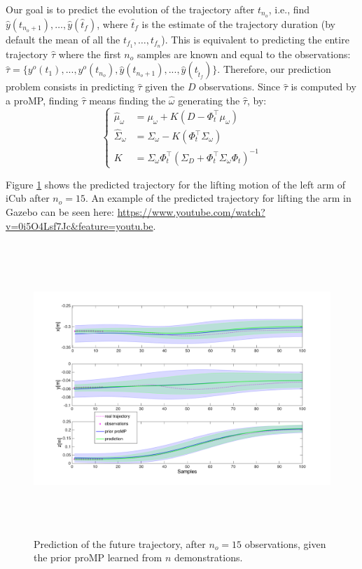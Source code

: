 Our goal is to predict the evolution of the trajectory after $t_{n_o}$, i.e., find $\hat{y}(t_{n_o+1}),\ldots,\hat{y}(\hat{t}_f)$, where $\hat{t}_f$ is the estimate of the trajectory duration (by default the mean of all the $t_{f_1}, \ldots, t_{f_n}$). 
This is equivalent to predicting the entire trajectory $\hat{\tau}$ where the first $n_o$ samples are known and equal to the observations: $\hat{\tau} = \{y^o(t_{1}), ..., y^o(t_{n_o}), \hat{y}(t_{n_o+1}), ..., \hat{y}(t_{\hat{t}_f})\}$.
Therefore, our prediction problem consists in predicting $\hat{\tau}$ given the $D$ observations. Since $\hat{\tau}$ is computed by a proMP, finding $\hat{\tau}$ means finding the $\hat{\omega}$ generating the  $\hat{\tau}$, by:
$$\left\{
\begin{array}{rl}
\hat{\mu}_\omega &= \mu_\omega + K(D - \Phi_t^\top \mu_\omega) \\ 
\hat{\Sigma}_\omega &= \Sigma_\omega - K(\Phi_t^\top \Sigma_\omega) \\
K&= \Sigma_\omega\Phi_t^\top(\Sigma_D + \Phi_t^\top\Sigma_\omega \Phi_t)^{-1}
\end{array}
\right.$$

Figure \ref{fig:predictionLifting15} shows the predicted trajectory for the lifting motion of the left arm of iCub after $n_{o}=15$. An example of the predicted trajectory for lifting the arm in Gazebo can be seen here: \url{https://www.youtube.com/watch?v=0i5O4Lsf7Jc&feature=youtu.be}.


\begin{figure}[h]
\centering
\includegraphics[height=11cm]{figs/proMP_prediction.pdf}
\caption{Prediction of the future trajectory, after $n_o=15$ observations, given the prior proMP learned from $n$ demonstrations.}
\label{fig:predictionLifting15}
\end{figure}










